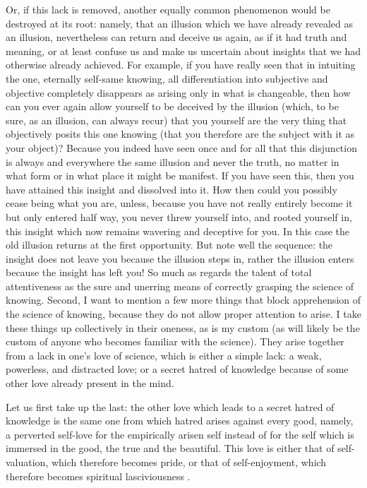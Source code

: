 Or, if this lack is removed, another equally common phenomenon
would be destroyed at its root:
namely, that an illusion which we have already
revealed as an illusion,
nevertheless can return and deceive us again,
as if it had truth and meaning,
or at least confuse us and make us uncertain
about insights that we had otherwise already achieved.
For example, if you have really seen that
in intuiting the one, eternally self-same knowing,
all differentiation into subjective and objective
completely disappears as arising only in what is changeable,
then how can you ever again allow yourself to be deceived
by the illusion (which, to be sure, as an illusion, can always recur)
that you yourself are the very thing that objectively posits this one knowing
(that you therefore are the subject with it as your object)?
Because you indeed have seen once and for all
that this disjunction is always and everywhere the same
illusion and never the truth,
no matter in what form or in what place it might be manifest.
If you have seen this,
then you have attained this insight
and dissolved into it.
How then could you possibly cease being what you are, unless,
because you have not really entirely become it
but only entered half way,
you never threw yourself into,
and rooted yourself in,
this insight which now remains
wavering and deceptive for you.
In this case the old illusion returns
at the first opportunity.
But note well the sequence:
the insight does not leave you
because the illusion steps in,
rather the illusion enters
because the insight has left you!
So much as regards the talent of
total attentiveness as the sure and unerring
means of correctly grasping the science of knowing.
Second, I want to mention a few more things
that block apprehension of the science of knowing,
because they do not allow proper attention to arise.
I take these things up collectively in their oneness,
as is my custom (as will likely be the
custom of anyone who becomes familiar with the science).
They arise together from a lack in one’s love of science,
which is either a simple lack:
a weak, powerless, and distracted love;
or a secret hatred of knowledge because of
some other love already present in the mind.

Let us first take up the last:
the other love which leads to a secret hatred
of knowledge is the same one from which hatred arises against every good,
namely, a perverted self-love for the empirically arisen self instead of for the
self which is immersed in the good, the true and the beautiful.
This love is either that of self-valuation,
which therefore becomes pride, or that of self-enjoyment,
which therefore becomes spiritual lasciviousness .

